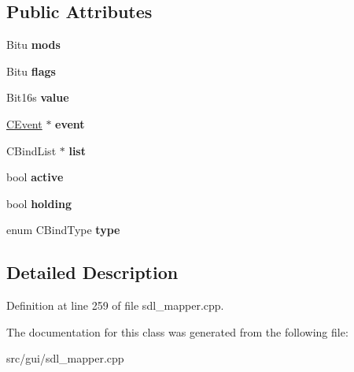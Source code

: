 \subsection*{Public Attributes}
\begin{DoxyCompactItemize}
\item 
\hypertarget{classCBind_a91f9c2be14e33caf50f7be9157e67cc8}{Bitu {\bfseries mods}}\label{classCBind_a91f9c2be14e33caf50f7be9157e67cc8}

\item 
\hypertarget{classCBind_a3d65630e149aa1df6f84cc78851f4d6c}{Bitu {\bfseries flags}}\label{classCBind_a3d65630e149aa1df6f84cc78851f4d6c}

\item 
\hypertarget{classCBind_afff7b6160648ad63671611c53b1b6a7e}{Bit16s {\bfseries value}}\label{classCBind_afff7b6160648ad63671611c53b1b6a7e}

\item 
\hypertarget{classCBind_a5a1677133911a7bc26357f56acc9f4dd}{\hyperlink{classCEvent}{C\-Event} $\ast$ {\bfseries event}}\label{classCBind_a5a1677133911a7bc26357f56acc9f4dd}

\item 
\hypertarget{classCBind_a8adfc03bb65f5a8637d2c35c0b604822}{C\-Bind\-List $\ast$ {\bfseries list}}\label{classCBind_a8adfc03bb65f5a8637d2c35c0b604822}

\item 
\hypertarget{classCBind_ae469e84d9c8d985542ff5a65d6c86810}{bool {\bfseries active}}\label{classCBind_ae469e84d9c8d985542ff5a65d6c86810}

\item 
\hypertarget{classCBind_a4a0d6d7650d3a24cc0bc68c985d26ade}{bool {\bfseries holding}}\label{classCBind_a4a0d6d7650d3a24cc0bc68c985d26ade}

\item 
\hypertarget{classCBind_a9e5121ab697c2c56cb20a20bd151ac45}{enum C\-Bind\-Type {\bfseries type}}\label{classCBind_a9e5121ab697c2c56cb20a20bd151ac45}

\end{DoxyCompactItemize}


\subsection{Detailed Description}


Definition at line 259 of file sdl\-\_\-mapper.\-cpp.



The documentation for this class was generated from the following file\-:\begin{DoxyCompactItemize}
\item 
src/gui/sdl\-\_\-mapper.\-cpp\end{DoxyCompactItemize}
